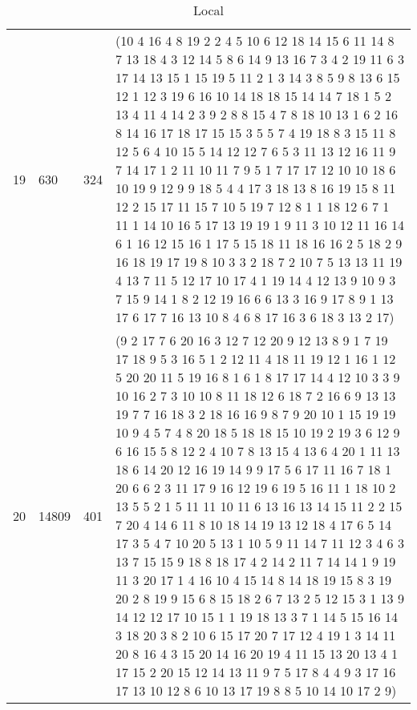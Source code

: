 \begin{table}
\begin{tabularx}{\textwidth}{| X | X | X | p{13cm} |}
19 & 630 & 324 & (10 4 16 4 8 19 2 2 4 5 10 6 12 18 14 15 6 11 14 8 7 13 18 4 3 12 14 5 8 6 14 9 13 16 7 3 4 2 19 11 6 3 17 14 13 15 1 15 19 5 11 2 1 3 14 3 8 5 9 8 13 6 15 12 1 12 3 19 6 16 10 14 18 18 15 14 14 7 18 1 5 2 13 4 11 4 14 2 3 9 2 8 8 15 4 7 8 18 10 13 1 6 2 16 8 14 16 17 18 17 15 15 3 5 5 7 4 19 18 8 3 15 11 8 12 5 6 4 10 15 5 14 12 12 7 6 5 3 11 13 12 16 11 9 7 14 17 1 2 11 10 11 7 9 5 1 7 17 17 12 10 10 18 6 10 19 9 12 9 9 18 5 4 4 17 3 18 13 8 16 19 15 8 11 12 2 15 17 11 15 7 10 5 19 7 12 8 1 1 18 12 6 7 1 11 1 14 10 16 5 17 13 19 19 1 9 11 3 10 12 11 16 14 6 1 16 12 15 16 1 17 5 15 18 11 18 16 16 2 5 18 2 9 16 18 19 17 19 8 10 3 3 2 18 7 2 10 7 5 13 13 11 19 4 13 7 11 5 12 17 10 17 4 1 19 14 4 12 13 9 10 9 3 7 15 9 14 1 8 2 12 19 16 6 6 13 3 16 9 17 8 9 1 13 17 6 17 7 16 13 10 8 4 6 8 17 16 3 6 18 3 13 2 17) \\
20 & 14809 & 401 & (9 2 17 7 6 20 16 3 12 7 12 20 9 12 13 8 9 1 7 19 17 18 9 5 3 16 5 1 2 12 11 4 18 11 19 12 1 16 1 12 5 20 20 11 5 19 16 8 1 6 1 8 17 17 14 4 12 10 3 3 9 10 16 2 7 3 10 10 8 11 18 12 6 18 7 2 16 6 9 13 13 19 7 7 16 18 3 2 18 16 16 9 8 7 9 20 10 1 15 19 19 10 9 4 5 7 4 8 20 18 5 18 18 15 10 19 2 19 3 6 12 9 6 16 15 5 8 12 2 4 10 7 8 13 15 4 13 6 4 20 1 11 13 18 6 14 20 12 16 19 14 9 9 17 5 6 17 11 16 7 18 1 20 6 6 2 3 11 17 9 16 12 19 6 19 5 16 11 1 18 10 2 13 5 5 2 1 5 11 11 10 11 6 13 16 13 14 15 11 2 2 15 7 20 4 14 6 11 8 10 18 14 19 13 12 18 4 17 6 5 14 17 3 5 4 7 10 20 5 13 1 10 5 9 11 14 7 11 12 3 4 6 3 13 7 15 15 9 18 8 18 17 4 2 14 2 11 7 14 14 1 9 19 11 3 20 17 1 4 16 10 4 15 14 8 14 18 19 15 8 3 19 20 2 8 19 9 15 6 8 15 18 2 6 7 13 2 5 12 15 3 1 13 9 14 12 12 17 10 15 1 1 19 18 13 3 7 1 14 5 15 16 14 3 18 20 3 8 2 10 6 15 17 20 7 17 12 4 19 1 3 14 11 20 8 16 4 3 15 20 14 16 20 19 4 11 15 13 20 13 4 1 17 15 2 20 15 12 14 13 11 9 7 5 17 8 4 4 9 3 17 16 17 13 10 12 8 6 10 13 17 19 8 8 5 10 14 10 17 2 9) \\
\hline
\end{tabularx}
\caption{Local}
\end{table}

